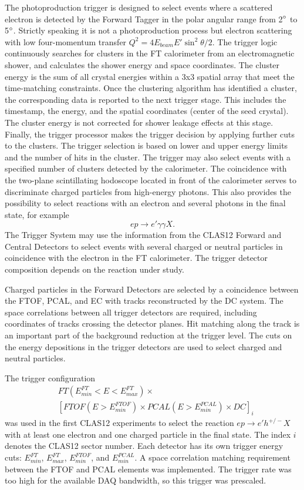 The photoproduction trigger is designed to select events where a scattered electron is detected by the Forward Tagger in the polar angular range from 2$\degree$ to 5$\degree$. Strictly speaking it is not a photoproduction process but electron scattering with low four-momentum transfer $Q^2=4E_{beam}E'\sin^2\theta/2$. The trigger logic continuously searches for clusters in the FT calorimeter from an electromagnetic shower, and calculates the shower energy and space coordinates. The cluster energy is the sum of all  crystal energies within a 3x3 spatial array that meet the time-matching constraints. Once the clustering algorithm  has identified a cluster, the corresponding data is reported to the next trigger stage. This includes the timestamp, the energy, and the spatial coordinates (center of the seed crystal). The cluster energy is not corrected for shower leakage effects at this stage. Finally, the trigger processor makes the trigger decision by applying further cuts to the clusters. The trigger  selection is based on lower and upper energy limits and the number of hits in the cluster. The trigger may also select events with a specified number of clusters detected by the calorimeter.  The coincidence with the two-plane  scintillating hodoscope   located in front of the calorimeter serves to discriminate charged particles from high-energy photons. This also provides  the possibility to select reactions with an electron and several photons in the final state, for example
$$
ep\to e'\gamma\gamma X.
$$
\noindent
The Trigger System may use the  information from the CLAS12 Forward and Central Detectors to select events with several charged or neutral particles in coincidence with the electron in the FT calorimeter. The trigger detector composition depends on the reaction under study. 

Charged particles in the Forward Detectors are selected by a coincidence between the FTOF, PCAL, and EC with tracks reconstructed by the DC system. The space correlations between all trigger detectors are required, including coordinates of tracks crossing the detector planes. Hit matching along the track is an important part of the background reduction at the trigger level. The cuts on the energy depositions in the trigger detectors are used to select charged and neutral particles. 
 
 The trigger configuration 
 \begin{align*} 
 &FT(E^{FT}_{min}{<}E{<}E^{FT}_{max})\times\\
 & [FTOF(E{>}E^{FTOF}_{min})\times PCAL(E{>}E^{PCAL}_{min})\times  DC]_i
\end{align*}
was used in the first CLAS12 experiments to select the reaction $ep\to e'h^{+/-}X$ with at least one electron and one charged particle in the final state. The index $i$ denotes the CLAS12 sector number. Each detector has its own trigger energy cuts: $ E^{FT}_{min}$,  $E^{FT}_{max}$, $E^{FTOF}_{min}$, and $E^{PCAL}_{min}$. A space correlation matching requirement between the FTOF and PCAL elements was implemented. The trigger rate was too high for the available DAQ bandwidth, so this trigger was prescaled. 

